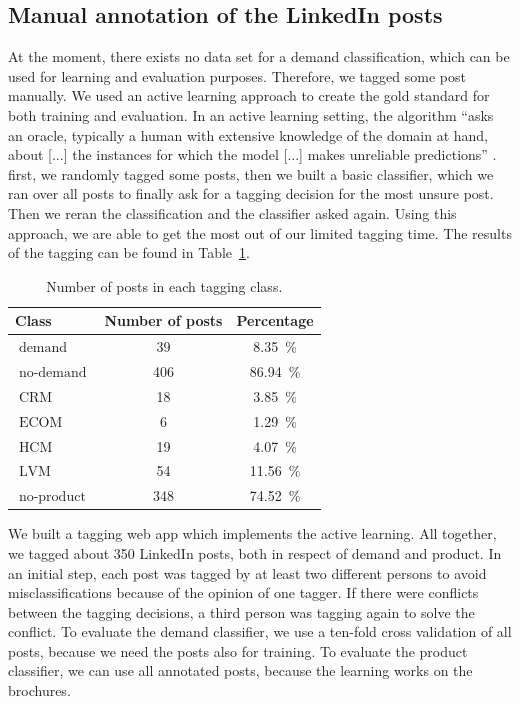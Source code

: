 \subsection{Manual annotation of the LinkedIn posts}

At the moment, there exists no data set for a demand classification, which can be used for learning and evaluation purposes.
Therefore, we tagged some post manually.
We used an active learning approach to create the gold standard for both training and evaluation.
In an active learning setting, the algorithm ``asks an oracle, typically a human with extensive knowledge of the domain at hand, about [...] the instances for which the model [...] makes unreliable predictions'' \cite{olsson2009literature}.
first, we randomly tagged some posts, then we built a basic classifier, which we ran over all posts to finally ask for a tagging decision for the most unsure post.
Then we reran the classification and the classifier asked again.
Using this approach, we are able to get the most out of our limited tagging time.
The results of the tagging can be found in Table~\ref{table:data_overview}.

\begin{table}[h]
	\centering
	\begin{tabular}{lcc}
		\hline
		\textbf{Class} & \textbf{Number of posts} & \textbf{Percentage} \\
		\hline
		\hline
		$\operatorname{demand}$ & 39 & 8.35~\% \\
		\hline
		$\operatorname{no-demand}$ & 406 & 86.94~\% \\
		\hline
		\hline
		$\operatorname{CRM}$ & 18 & 3.85~\% \\
		\hline
		$\operatorname{ECOM}$ & 6 & 1.29~\% \\
		\hline
		$\operatorname{HCM}$ & 19 & 4.07~\% \\
		\hline
		$\operatorname{LVM}$ & 54 & 11.56~\% \\
		\hline
		$\operatorname{no-product}$ & 348 & 74.52~\% \\
		\hline
	\end{tabular}
	\caption{Number of posts in each tagging class.}
	\label{table:data_overview}
\end{table}


We built a tagging web app which implements the active learning.
All together, we tagged about 350 LinkedIn posts, both in respect of demand and product.
In an initial step, each post was tagged by at least two different persons to avoid misclassifications because of the opinion of one tagger.
If there were conflicts between the tagging decisions, a third person was tagging again to solve the conflict.
To evaluate the demand classifier, we use a ten-fold cross validation of all posts, because we need the posts also for training.
To evaluate the product classifier, we can use all annotated posts, because the learning works on the brochures.

